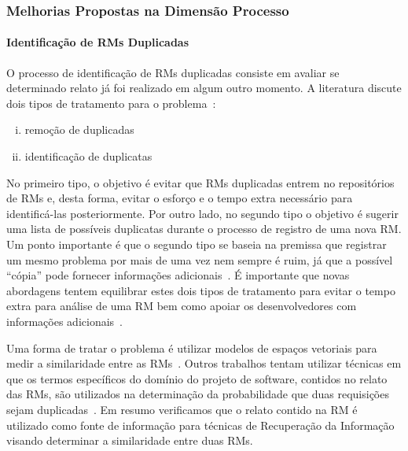 \subsubsection{Melhorias Propostas na Dimensão Processo}
\label{ssub:melhorias_dim_processo}

\paragraph{Identificação de RMs Duplicadas}

O processo de identificação de RMs duplicadas consiste em avaliar se
determinado relato já foi realizado em algum outro momento.  A literatura
discute dois tipos de tratamento para o problema~\cite{kaushik2012comparative,
    Tian2012}:

\begin{enumerate}[(i)]

	\item remoção de duplicadas

	\item identificação de duplicatas

\end{enumerate}

No primeiro tipo, o objetivo é evitar que RMs duplicadas entrem no repositórios
de RMs e, desta forma, evitar o esforço e o tempo extra necessário para
identificá-las posteriormente. Por outro lado, no segundo tipo o objetivo é
sugerir uma lista de possíveis duplicatas durante o processo de registro de uma
nova RM\@. Um ponto importante é que o segundo tipo se baseia na premissa que
registrar um mesmo problema por mais de uma vez nem sempre é ruim, já que a
possível ``cópia'' pode fornecer informações
adicionais~\cite{bettenburg2008duplicate}. É importante que novas abordagens
tentem equilibrar estes dois tipos de tratamento para evitar o tempo extra para
análise de uma RM bem como apoiar os desenvolvedores com informações
adicionais~\cite{Lerch:2013:FDY:2495256.2495763,Thung2014}.

Uma forma de tratar o problema é utilizar modelos de espaços vetoriais para
medir a similaridade entre as RMs~\cite{liu2014faceted, sun2010discriminative,
    Thung2014,tomavsev2013exploiting}. Outros trabalhos tentam utilizar técnicas
em que os termos específicos do domínio do projeto de software, contidos no
relato das RMs, são utilizados na determinação da probabilidade que duas
requisições sejam duplicadas~\cite{hindle2016contextual, alipour2013contextual}.
Em resumo verificamos que o relato contido na RM é utilizado como fonte de
informação para técnicas de Re\-cu\-pe\-ra\-ção da Informação visando determinar
a similaridade entre duas RMs.

